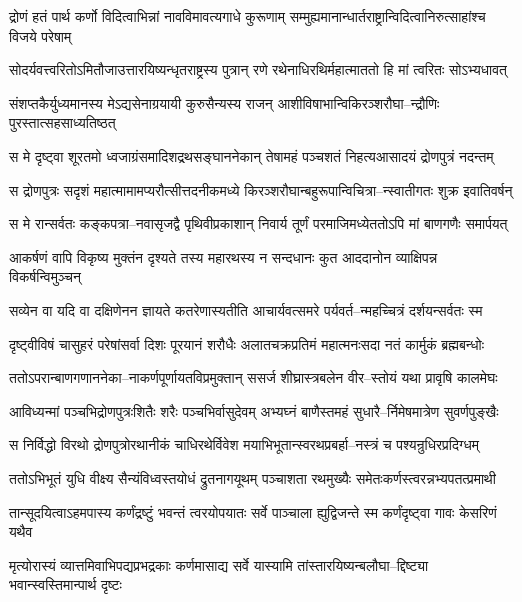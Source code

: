 \twolineshloka
{द्रोणं हतं पार्थ कर्णो विदित्वाभिन्नां नावविमावत्यगाधे कुरूणाम्}
{सम्मुह्यमानान्धार्तराष्ट्रान्विदित्वानिरुत्साहांश्च विजये परेषाम्}


\twolineshloka
{सोदर्यवत्त्वरितोऽमितौजाउत्तारयिष्यन्धृतराष्ट्रस्य पुत्रान्}
{रणे रथेनाधिरथिर्महात्माततो हि मां त्वरितः सोऽभ्यधावत्}


\twolineshloka
{संशप्तकैर्युध्यमानस्य मेऽद्यसेनाग्रयायी कुरुसैन्यस्य राजन्}
{आशीविषाभान्विकिरञ्शरौघा--न्द्रौणिः पुरस्तात्सहसाध्यतिष्ठत्}


\twolineshloka
{स मे दृष्ट्वा शूरतमो ध्वजाग्रंसमादिशद्रथसङ्घाननेकान्}
{तेषामहं पञ्चशतं निहत्यआसादयं द्रोणपुत्रं नदन्तम्}


\twolineshloka
{स द्रोणपुत्रः सदृशं महात्मामामप्यरौत्सीत्तदनीकमध्ये}
{किरञ्शरौघान्बहुरूपान्विचित्रा--न्स्वातीगतः शुक्र इवातिवर्षन्}


\twolineshloka
{स मे रान्सर्वतः कङ्कपत्रा--नवासृजद्वै पृथिवीप्रकाशान्}
{निवार्य तूर्णं परमाजिमध्येततोऽपि मां बाणगणैः समार्पयत्}


\twolineshloka
{आकर्षणं वापि विकृष्य मुक्तंन दृश्यते तस्य महारथस्य}
{न सन्दधानः कुत आददानोन व्याक्षिपन्न विकर्षन्विमुञ्चन्}


\twolineshloka
{सव्येन वा यदि वा दक्षिणेनन ज्ञायते कतरेणास्यतीति}
{आचार्यवत्समरे पर्यवर्त--न्महच्चित्रं दर्शयन्सर्वतः स्म}


\twolineshloka
{दृष्ट्वीविषं चासुहरं परेषांसर्वा दिशः पूरयानं शरौधैः}
{अलातचक्रप्रतिमं महात्मनःसदा नतं कार्मुकं ब्रह्मबन्धोः}


\twolineshloka
{ततोऽपरान्बाणगणाननेका--नाकर्णपूर्णायतविप्रमुक्तान्}
{ससर्ज शीघ्रास्त्रबलेन वीर--स्तोयं यथा प्रावृषि कालमेघः}


\twolineshloka
{आविध्यन्मां पञ्चभिद्रोणपुत्रःशितैः शरैः पञ्चभिर्वासुदेवम्}
{अभ्यघ्नं बाणैस्तमहं सुधारै--र्निमेषमात्रेण सुवर्णपुङ्खैः}


\twolineshloka
{स निर्विद्धो विरथो द्रोणपुत्रोरथानीकं चाधिरथेर्विवेश}
{मयाभिभूतान्स्वरथप्रबर्हा--नस्त्रं च पश्यन्रुधिरप्रदिग्धम्}


\twolineshloka
{ततोऽभिभूतं युधि वीक्ष्य सैन्यंविध्वस्तयोधं द्रुतनागयूथम्}
{पञ्चाशता रथमुख्यैः समेतःकर्णस्त्वरन्नभ्यपतत्प्रमाथी}


\twolineshloka
{तान्सूदयित्वाऽहमपास्य कर्णंद्रष्टुं भवन्तं त्वरयोपयातः}
{सर्वे पाञ्चाला ह्युद्विजन्ते स्म कर्णंदृष्ट्वा गावः केसरिणं यथैव}


\twolineshloka
{मृत्योरास्यं व्यात्तमिवाभिपद्यप्रभद्रकाः कर्णमासाद्य सर्वे}
{यास्यामि तांस्तारयिष्यन्बलौघा--द्दिष्ट्या भवान्स्वस्तिमान्पार्थ दृष्टः}


